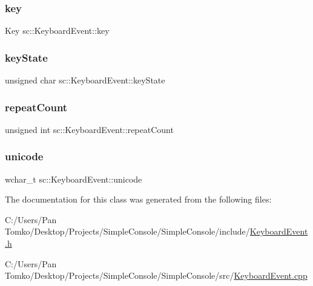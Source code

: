 \subsubsection{\texorpdfstring{key}{key}}
{\footnotesize\ttfamily Key sc\+::\+Keyboard\+Event\+::key}

\mbox{\label{classsc_1_1_keyboard_event_a69b277f5727484ee70ef84d111f0fef4}} 
\subsubsection{\texorpdfstring{keyState}{keyState}}
{\footnotesize\ttfamily unsigned char sc\+::\+Keyboard\+Event\+::key\+State}

\mbox{\label{classsc_1_1_keyboard_event_aa899d5308d0a56dc6a64e7c704dd209c}} 
\subsubsection{\texorpdfstring{repeatCount}{repeatCount}}
{\footnotesize\ttfamily unsigned int sc\+::\+Keyboard\+Event\+::repeat\+Count}

\mbox{\label{classsc_1_1_keyboard_event_a7917fcb07afaad8403c660c12546a279}} 
\subsubsection{\texorpdfstring{unicode}{unicode}}
{\footnotesize\ttfamily wchar\+\_\+t sc\+::\+Keyboard\+Event\+::unicode}



The documentation for this class was generated from the following files\+:\begin{DoxyCompactItemize}
\item 
C\+:/\+Users/\+Pan Tomko/\+Desktop/\+Projects/\+Simple\+Console/\+Simple\+Console/include/\mbox{\hyperlink{_keyboard_event_8h}{Keyboard\+Event.\+h}}\item 
C\+:/\+Users/\+Pan Tomko/\+Desktop/\+Projects/\+Simple\+Console/\+Simple\+Console/src/\mbox{\hyperlink{_keyboard_event_8cpp}{Keyboard\+Event.\+cpp}}\end{DoxyCompactItemize}
